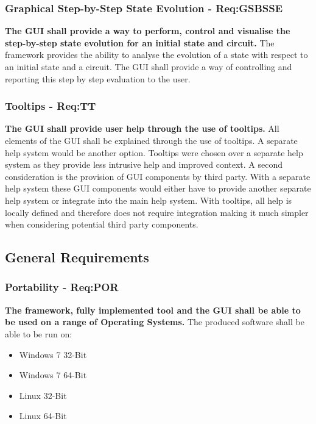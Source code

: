 \subsubsection{Graphical Step-by-Step State Evolution - Req:GSBSSE}
\label{sec:reqgsbsse}
\textbf{The GUI shall provide a way to perform, control and visualise the step-by-step state evolution for an initial state and circuit.}
The framework provides the ability to analyse the evolution of a state with respect to an initial state and a circuit.
The GUI shall provide a way of controlling and reporting this step by step evaluation to the user.

\subsubsection{Tooltips - Req:TT}
\label{sec:reqtt}
\textbf{The GUI shall provide user help through the use of tooltips.}
All elements of the GUI shall be explained through the use of tooltips.
A separate help system would be another option.
Tooltips were chosen over a separate help system as they provide less intrusive help and improved context.
A second consideration is the provision of GUI components by third party.
With a separate help system these GUI components would either have to provide another separate help system or integrate into the main help system.
With tooltips, all help is locally defined and therefore does not require integration making it much simpler when considering potential third party components.

\subsection{General Requirements}
\subsubsection{Portability - Req:POR}
\label{sec:reqpor}
\textbf{The framework, fully implemented tool and the GUI shall be able to be used on a range of Operating Systems.}
The produced software shall be able to be run on:
\begin{itemize}
 \item Windows 7 32-Bit
 \item Windows 7 64-Bit
 \item Linux 32-Bit
 \item Linux 64-Bit
\end{itemize}
% 
